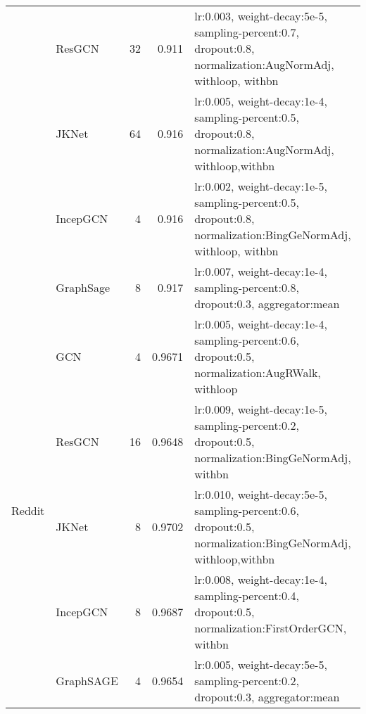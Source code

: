 \documentclass{article}
\begin{document}
\begin{table}[p]
\begin{tabular}{cl|r|r|p{}}
\cline{2-5}          & ResGCN & 32    & 0.911 &  lr:0.003, weight-decay:5e-5, sampling-percent:0.7, dropout:0.8, normalization:AugNormAdj, withloop, withbn \\
\cline{2-5}          & JKNet & 64    & 0.916 &  lr:0.005, weight-decay:1e-4, sampling-percent:0.5, dropout:0.8, normalization:AugNormAdj, withloop,withbn \\
\cline{2-5}          & IncepGCN & 4     & 0.916 & lr:0.002, weight-decay:1e-5, sampling-percent:0.5, dropout:0.8, normalization:BingGeNormAdj, withloop, withbn \\
\cline{2-5}          & GraphSage & 8     & 0.917 &   lr:0.007, weight-decay:1e-4, sampling-percent:0.8, dropout:0.3, aggregator:mean \\
    \hline
    \multirow{5}[10]{*}{Reddit} & GCN   & 4     & 0.9671 &  lr:0.005, weight-decay:1e-4, sampling-percent:0.6, dropout:0.5, normalization:AugRWalk, withloop \\
\cline{2-5}          & ResGCN & 16    & 0.9648 & lr:0.009, weight-decay:1e-5, sampling-percent:0.2, dropout:0.5, normalization:BingGeNormAdj, withbn \\
\cline{2-5}          & JKNet & 8     & 0.9702 & lr:0.010, weight-decay:5e-5, sampling-percent:0.6, dropout:0.5, normalization:BingGeNormAdj, withloop,withbn \\
\cline{2-5}          & IncepGCN & 8     & 0.9687 &  lr:0.008, weight-decay:1e-4, sampling-percent:0.4, dropout:0.5, normalization:FirstOrderGCN, withbn \\
\cline{2-5}          & GraphSAGE & 4     & 0.9654 &  lr:0.005, weight-decay:5e-5, sampling-percent:0.2, dropout:0.3, aggregator:mean \\
    \hline
    \end{tabular}\label{tab:hyperparameterdetails}\end{table}
\end{document}
